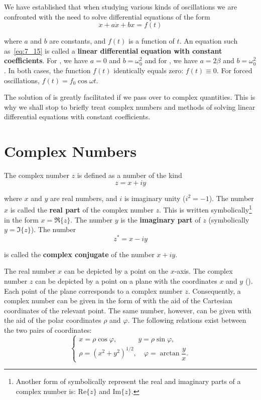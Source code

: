 We have established that when studying various kinds of oscillations we are confronted with the need to solve differential equations of the form
\begin{equation}\label{eq:7_15}
	\ddot{x} + a\dot{x} +bx = f(t)
\end{equation}

\noindent
where $a$ and $b$ are constants, and $f(t)$ is a function of $t$. An equation such as~\eqref{eq:7_15} is called a \textbf{linear differential equation with constant coefficients}. For , we have $a=0$ and $b=\omega_0^2$ and for , we have $a=2\beta$ and $b=\omega_0^2$. In both cases, the function $f(t)$ identically equals zero: $f(t)\equiv 0$. For forced oscillations, $f(t)=f_0\cos\omega t$.

The solution of  is greatly facilitated if we pass over to complex quantities. This is why we shall stop to briefly treat complex numbers and methods of solving linear differential equations with constant coefficients.

\section{Complex Numbers}\label{sec:7_3}

The complex number $z$ is defined as a number of the kind
\begin{equation}\label{eq:7_16}
	z = x + iy
\end{equation}

\noindent
where $x$ and $y$ are real numbers, and $i$ is imaginary unity ($i^2=-1$). The number $x$ is called the \textbf{real part} of the complex number $z$. This is written symbolically\footnote{Another form of symbolically represent the real and imaginary parts of a complex number is: $\mathrm{Re}\{z\}$ and $\mathrm{Im}\{z\}$.} in the form $x=\Re\{z\}$. The number $y$ is the \textbf{imaginary part} of $z$ (symbolically $y=\Im\{z\}$). The number
\begin{equation}\label{eq:7_17}
	z^* = x - iy
\end{equation}

\noindent
is called the \textbf{complex conjugate} of the number $x+iy$. 

The real number $x$ can be depicted by a point on the $x$-axis. The complex number $z$ can be depicted by a point on a plane with the coordinates $x$ and $y$ (). Each point of the plane corresponds to a complex number $z$. Consequently, a complex number can be given in the form of  with the aid of the Cartesian coordinates of the relevant point. The same number, however, can be given with the aid of the polar coordinates $\rho$ and $\varphi$. The following relations exist between the two pairs of coordinates:
\begin{equation}\label{eq:7_18}
	\begin{cases}
		x = \rho\cos\varphi,\quad\quad\quad y = \rho\sin\varphi,\\
		\rho = \left(x^2+y^2\right)^{1/2},\quad \varphi = \arctan\dfrac{y}{x}.
	\end{cases}
\end{equation}

